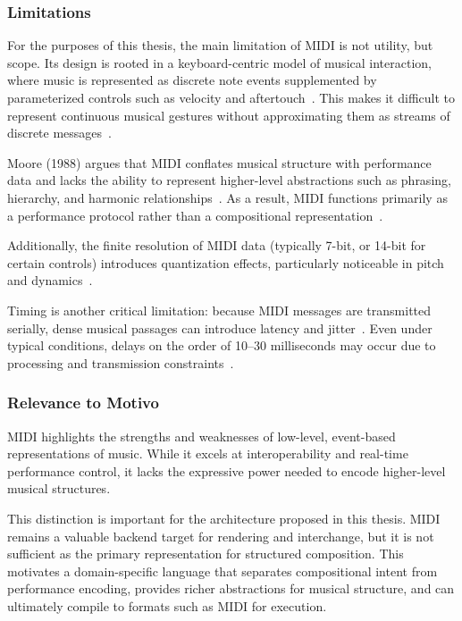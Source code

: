 
\subsubsection{Limitations}

For the purposes of this thesis, the main limitation of MIDI is not utility, but scope.
Its design is rooted in a keyboard-centric model of musical interaction, where music is represented as discrete note
events supplemented by parameterized controls such as velocity and aftertouch~\cite{Moore_1988}.
This makes it difficult to represent continuous musical gestures without approximating them as streams of discrete
messages~\cite{Moore_1988}.

Moore (1988) argues that MIDI conflates musical structure with performance data and lacks the ability to represent
higher-level abstractions such as phrasing, hierarchy, and harmonic relationships~\cite{Moore_1988}.
As a result, MIDI functions primarily as a performance protocol rather than a compositional
representation~\cite{Moore_1988}.

Additionally, the finite resolution of MIDI data (typically 7-bit, or 14-bit for certain controls) introduces
quantization effects, particularly noticeable in pitch and dynamics~\cite{Moore_1988}.

Timing is another critical limitation: because MIDI messages are transmitted serially, dense musical passages can
introduce latency and jitter~\cite{Moog_1986}.
Even under typical conditions, delays on the order of 10--30 milliseconds may occur due to processing and transmission
constraints~\cite{Moog_1986}.


\subsubsection{Relevance to Motivo}

MIDI highlights the strengths and weaknesses of low-level, event-based representations of music.
While it excels at interoperability and real-time performance control, it lacks the expressive power needed to encode
higher-level musical structures.

This distinction is important for the architecture proposed in this thesis.
MIDI remains a valuable backend target for rendering and interchange, but it is not sufficient as the primary
representation for structured composition.
This motivates a domain-specific language that separates compositional intent from performance encoding,
provides richer abstractions for
musical structure, and can ultimately compile to formats such as MIDI for execution.

